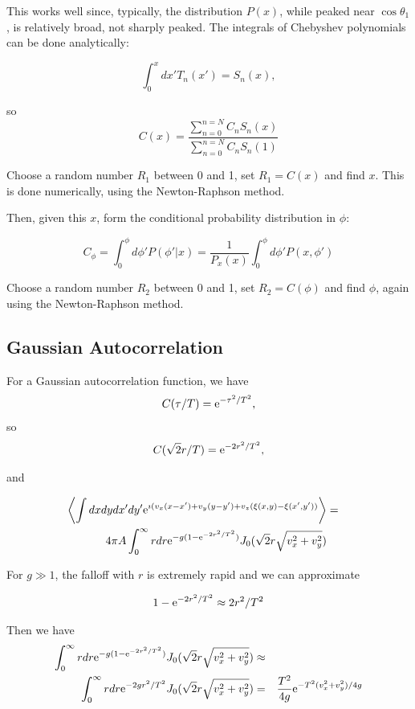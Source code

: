 \documentclass[11pt]{article}
\newcommand{\e}{{\rm e}}
\begin{document}
{{{{This works well since, typically, the distribution $P(x)$, while
peaked near $\cos\theta_{1}$, is relatively broad, not sharply
peaked. The integrals of Chebyshev polynomials can be done
analytically:

$$\int_{0}^{x}dx'T_{n}(x')=S_{n}(x),$$

so
$$C(x)=\frac{\sum_{n=0}^{n=N}C_{n}S_{n}(x)}{\sum_{n=0}^{n=N}C_{n}S_{n}(1)}$$

Choose a random number $R_{1}$ between 0 and 1, set $R_{1}=C(x)$ and
find $x$.  This is done numerically, using the Newton-Raphson method.

Then, given this $x$, form the conditional probability distribution in $\phi$:

$$C_{\phi}=\int_{0}^{\phi}d\phi'P(\phi'|x)=\frac{1}{P_x(x)}\int_{0}^{\phi}d\phi'P(x,\phi')$$

Choose a random number $R_{2}$ between 0 and 1, set $R_{2}=C(\phi)$
and find $\phi$, again using the Newton-Raphson method.


\subsection{Gaussian Autocorrelation}

 For a Gaussian autocorrelation function, we have
 $$C(\tau/T)=\e^{-\tau^{2}/T^{2}},$$
 so
 $$C(\sqrt{2}r/T)=\e^{-2r^{2}/T^{2}},$$

 and
 
 \begin{eqnarray}
\left<\int dx dydx'dy'\e^{\imath( v_{x}(x-x')+v_{y}(y-y')+v_{z}(\xi(x,y)-\xi(x',y'))}\right>&=&\\
4\pi A\int_{0}^{\infty} r dr\e^{-g(1-\e^{-2r^{2}/T^{2}})} J_{0}(\sqrt{2}r\sqrt{v_{x}^{2}+v_{y}^{2}})\end{eqnarray}
 
For $g\gg 1$, the falloff with $r$ is extremely rapid and we can approximate

$$1-\e^{-2r^{2}/T^{2}}\approx 2r^{2}/T^{2}$$

Then we have
\begin{eqnarray}
\int_{0}^{\infty} r dr\e^{-g(1-\e^{-2r^{2}/T^{2}})} J_{0}(\sqrt{2}r\sqrt{v_{x}^{2}+v_{y}^{2}})&\approx&\\
\int_{0}^{\infty} r dr\e^{-2gr^{2}/T^{2}} J_{0}(\sqrt{2}r\sqrt{v_{x}^{2}+v_{y}^{2}})&=&
\frac{T^{2}}{4g}\e^{-T^{2}(v_{x}^{2}+v_{y}^{2})/4g}
\end{eqnarray}

}}}}
\end{document}
